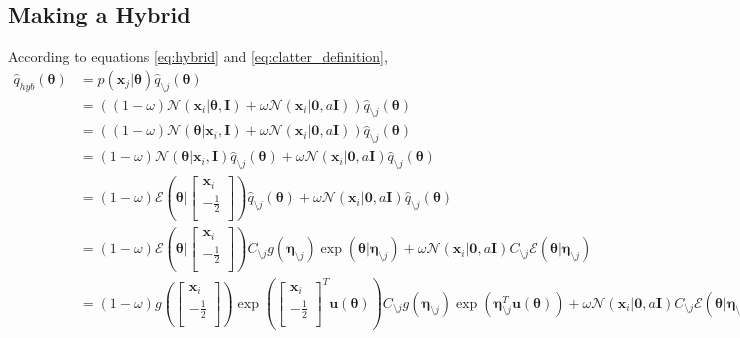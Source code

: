 \documentclass[a4]{article}
\begin{document}
\subsection {Making a Hybrid}
According to equations \ref{eq:hybrid} and \ref{eq:clatter_definition},
\begin{equation}
\begin{aligned}
\hat{q}_{hyb}(\bm{\theta})
&= p(\bm{x}_j|\bm{\theta})\hat{q}_{\setminus j}(\bm{\theta})\\
&= \left((1-\omega)\mathcal{N}(\bm{x}_i|\bm{\theta},\bm{I}) +
\omega\mathcal{N}(\bm{x}_i|\bm{0},a\bm{I})\right)\hat{q}_{\setminus j}(\bm{\theta})\\
&= \left((1-\omega)\mathcal{N}(\bm{\theta} | \bm{x}_i, \bm{I} ) +
\omega\mathcal{N}(\bm{x}_i|\bm{0},a\bm{I})\right)\hat{q}_{\setminus j}(\bm{\theta})\\
&=
(1-\omega)\mathcal{N}(\bm{\theta} | \bm{x}_i, \bm{I} )\hat{q}_{\setminus j}(\bm{\theta}) +
\omega\mathcal{N}(\bm{x}_i|\bm{0},a\bm{I})\hat{q}_{\setminus j}(\bm{\theta})\\
&=
(1-\omega)\mathcal{E}(\bm{\theta} | \begin{bmatrix}\bm{x}_i\\-\frac{1}{2}\\\end{bmatrix})
\hat{q}_{\setminus j}(\bm{\theta}) +
\omega\mathcal{N}(\bm{x}_i|\bm{0},a\bm{I})\hat{q}_{\setminus j}(\bm{\theta})\\
&=
(1-\omega)\mathcal{E}(\bm{\theta} | \begin{bmatrix}\bm{x}_i\\-\frac{1}{2}\\\end{bmatrix})
C_{\setminus j}g(\bm{\eta}_{\setminus j})\exp(\bm{\theta}|\bm{\eta}_{\setminus j}) +
\omega\mathcal{N}(\bm{x}_i|\bm{0},a\bm{I})
C_{\setminus j}\mathcal{E}(\bm{\theta}|\bm{\eta}_{\setminus j})\\
&=
(1-\omega)
g(\begin{bmatrix}\bm{x}_i\\-\frac{1}{2}\\\end{bmatrix})
\exp(\begin{bmatrix}\bm{x}_i\\-\frac{1}{2}\\\end{bmatrix}^T\bm{u}(\bm{\theta}))
C_{\setminus j}g(\bm{\eta}_{\setminus j})\exp(\bm{\eta}_{\setminus j}^T\bm{u}(\bm{\theta})) +
\omega\mathcal{N}(\bm{x}_i|\bm{0},a\bm{I}) C_{\setminus j}\mathcal{E}(\bm{\theta}|\bm{\eta}_{\setminus j})\\

\end{aligned}
\end{equation}
\end{document}
